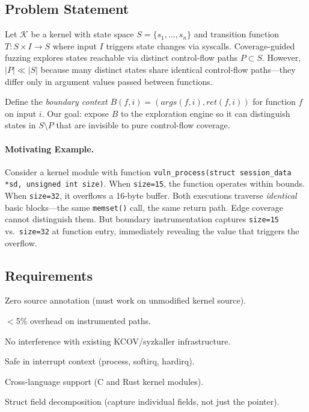 \documentclass{ndss}
\begin{document}
\subsection{Problem Statement}

Let $\mathcal{K}$ be a kernel with state space $S = \{s_1, \ldots, s_n\}$ and
transition function $T: S \times I \to S$ where input $I$ triggers state
changes via syscalls. Coverage-guided fuzzing explores states reachable via
distinct control-flow paths $P \subset S$. However, $|P| \ll |S|$ because many
distinct states share identical control-flow paths---they differ only in
argument values passed between functions.

Define the \emph{boundary context} $B(f, i) = (\mathit{args}(f, i),
\mathit{ret}(f, i))$ for function $f$ on input $i$. Our goal: expose $B$ to
the exploration engine so it can distinguish states in $S \setminus P$ that are
invisible to pure control-flow coverage.

\paragraph{Motivating Example.} Consider a kernel module with function
\texttt{vuln\_process(struct session\_data *sd, unsigned int size)}. When
\texttt{size=15}, the function operates within bounds. When \texttt{size=32},
it overflows a 16-byte buffer. Both executions traverse \emph{identical} basic
blocks---the same \texttt{memset()} call, the same return path. Edge coverage
cannot distinguish them. But boundary instrumentation captures
\texttt{size=15} vs.\ \texttt{size=32} at function entry, immediately revealing
the value that triggers the overflow.

\subsection{Requirements}

\begin{description}[nosep]
  \item[R1] Zero source annotation (must work on unmodified kernel source).
  \item[R2] $<$5\% overhead on instrumented paths.
  \item[R3] No interference with existing KCOV/syzkaller infrastructure.
  \item[R4] Safe in interrupt context (process, softirq, hardirq).
  \item[R5] Cross-language support (C and Rust kernel modules).
  \item[R6] Struct field decomposition (capture individual fields, not just
        the pointer).
\end{description}
\end{document}
